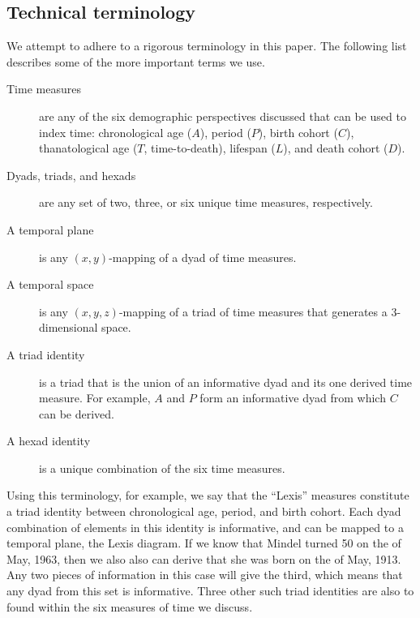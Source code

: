 \documentclass[11pt,oneside,a4paper]{article} %
\begin{document}
\subsection*{Technical terminology}
We attempt to adhere to a rigorous terminology in this paper. The following list
describes some of the more important terms we use.
\begin{description}
\item[Time measures] are any of the six demographic perspectives discussed that
can be used to index time: chronological age ($A$), period ($P$), birth cohort ($C$), thanatological
age ($T$, time-to-death), lifespan ($L$), and death cohort ($D$).
\item[Dyads, triads, and hexads] are any set of two, three, or six unique time
measures, respectively.
\item[A temporal plane] is any $(x,y)$-mapping of a dyad of time measures.
\item[A temporal space] is any $(x,y,z)$-mapping of a triad of time
measures that generates a 3-dimensional space.
\item[A triad identity] is a triad that is the union of an informative dyad and
its one derived time measure. For example, $A$ and $P$ form an informative dyad
from which $C$ can be derived.
\item[A hexad identity] is a unique combination of the six time measures.
\end{description}
Using this terminology, for example, we say that the ``Lexis'' measures
constitute a triad identity between chronological age, period, and birth cohort. Each dyad
combination of elements in this identity is informative, and can be mapped to a
temporal plane, the Lexis diagram. If we know that Mindel turned 50 on the
 of May, 1963, then we also also can derive that she was born on the  of
May, 1913. Any two pieces of information in this case will give the third, which
means that any dyad from this set is informative. Three other such triad
identities are also to found within the six measures of time we discuss.
\FloatBarrier
\end{document}
